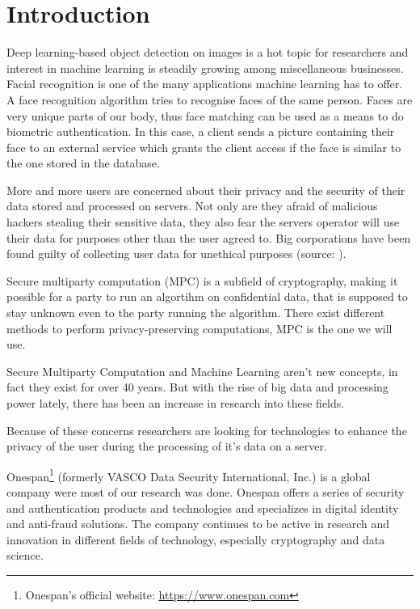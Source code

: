 
\chapter{Introduction}
Deep learning-based object detection on images is a hot topic for researchers and interest in machine learning is steadily growing among miscellaneous businesses. Facial recognition is one of the many applications machine learning has to offer. A face recognition algorithm tries to recognise faces of the same person. Faces are very unique parts of our body, thus face matching can be used as a means to do biometric authentication. In this case, a client sends a picture containing their face to an external service which grants the client access if the face is similar to the one stored in the database.

More and more users are concerned about their privacy and the security of their data stored and processed on servers. Not only are they afraid of malicious hackers stealing their sensitive data, they also fear the servers operator will use their data for purposes other than the user agreed to. Big corporations have been found guilty of collecting user data for unethical purposes (source: \cite{cadwalladr2018revealed}).

Secure multiparty computation (MPC) is a subfield of cryptography, making it possible for a party to run an algortihm on confidential data, that is supposed to stay unknown even to the party running the algorithm. There exist different methods to perform privacy-preserving computations, MPC is the one we will use.

Secure Multiparty Computation and Machine Learning aren't new concepts, in fact they exist for over 40 years. But with the rise of big data and processing power lately, there has been an increase in research into these fields.

Because of these concerns researchers are looking for technologies to enhance the privacy of the user during the processing of it's data on a server.

Onespan\footnote{Onespan's official website: \url{https://www.onespan.com}} (formerly VASCO Data Security International, Inc.) is a global company were most of our research was done. Onespan offers a series of security and authentication products and technologies and specializes in digital identity and anti-fraud solutions. The company continues to be active in research and innovation in different fields of technology, especially cryptography and data science.

